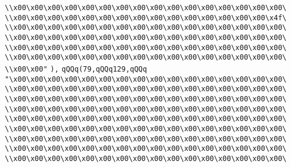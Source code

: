 \verb|\\x00\x00\x00\x00\x00\x00\x00\x00\x00\x00\x00\x00\x00\x00\x00\x00\|\newline
\verb|\\x00\x00\x00\x00\x00\x00\x00\x00\x00\x00\x00\x00\x00\x00\x00\x4f\|\newline
\verb|\\x00\x00\x00\x00\x00\x00\x00\x00\x00\x00\x00\x00\x00\x00\x00\x00\|\newline
\verb|\\x00\x00\x00\x00\x00\x00\x00\x00\x00\x00\x00\x00\x00\x00\x00\x00\|\newline
\verb|\\x00\x00\x00\x00\x00\x00\x00\x00\x00\x00\x00\x00\x00\x00\x00\x00\|\newline
\verb|\\x00\x00\x00\x00\x00\x00\x00\x00\x00\x00\x00\x00\x00\x00\x00\x00\|\newline
\verb|\\x00\x00"|\newline
\verb|),|\newline
\verb|qQQq(79,qQQq129,qQQq|\newline
\verb|"\x00\x00\x00\x00\x00\x00\x00\x00\x00\x00\x00\x00\x00\x00\x00\x00\|\newline
\verb|\\x00\x00\x00\x00\x00\x00\x00\x00\x00\x00\x00\x00\x00\x00\x00\x00\|\newline
\verb|\\x00\x00\x00\x00\x00\x00\x00\x00\x00\x00\x00\x00\x00\x00\x00\x00\|\newline
\verb|\\x00\x00\x00\x00\x00\x00\x00\x00\x00\x00\x00\x00\x00\x00\x00\x00\|\newline
\verb|\\x00\x00\x00\x00\x00\x00\x00\x00\x00\x00\x00\x00\x00\x00\x00\x00\|\newline
\verb|\\x00\x00\x00\x00\x00\x00\x00\x00\x00\x00\x00\x00\x00\x00\x00\x00\|\newline
\verb|\\x00\x00\x00\x00\x00\x00\x00\x00\x00\x00\x00\x00\x00\x00\x00\x00\|\newline
\verb|\\x00\x00\x00\x00\x00\x00\x00\x00\x00\x00\x00\x00\x00\x00\x00\x00\|\newline
\verb|\\x00\x00\x00\x00\x00\x00\x00\x00\x00\x00\x00\x00\x00\x00\x00\x00\|\newline

